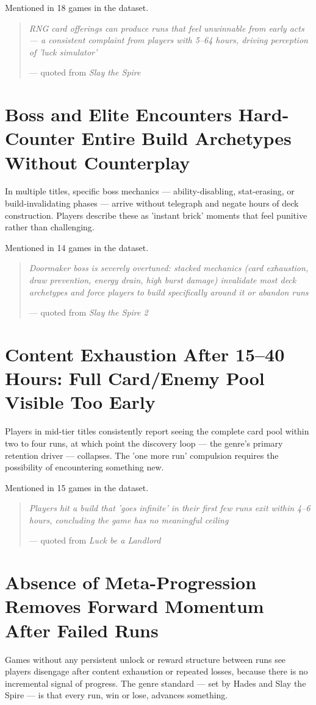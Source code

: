 \documentclass[11pt,letterpaper]{report}
\begin{document}
Mentioned in 18 games in the dataset.

\begin{quote}
\emph{RNG card offerings can produce runs that feel unwinnable from early acts — a consistent complaint from players with 5–64 hours, driving perception of 'luck simulator'}

— quoted from \emph{Slay the Spire}
\end{quote}
\section*{Boss and Elite Encounters Hard-Counter Entire Build Archetypes Without Counterplay}
\label{sec:org82d4431}
In multiple titles, specific boss mechanics — ability-disabling, stat-erasing, or build-invalidating phases — arrive without telegraph and negate hours of deck construction. Players describe these as 'instant brick' moments that feel punitive rather than challenging.

Mentioned in 14 games in the dataset.

\begin{quote}
\emph{Doormaker boss is severely overtuned: stacked mechanics (card exhaustion, draw prevention, energy drain, high burst damage) invalidate most deck archetypes and force players to build specifically around it or abandon runs}

— quoted from \emph{Slay the Spire 2}
\end{quote}
\section*{Content Exhaustion After 15–40 Hours: Full Card/Enemy Pool Visible Too Early}
\label{sec:orgf1c947a}
Players in mid-tier titles consistently report seeing the complete card pool within two to four runs, at which point the discovery loop — the genre's primary retention driver — collapses. The 'one more run' compulsion requires the possibility of encountering something new.

Mentioned in 15 games in the dataset.

\begin{quote}
\emph{Players hit a build that 'goes infinite' in their first few runs exit within 4–6 hours, concluding the game has no meaningful ceiling}

— quoted from \emph{Luck be a Landlord}
\end{quote}
\section*{Absence of Meta-Progression Removes Forward Momentum After Failed Runs}
\label{sec:org39c40d6}
Games without any persistent unlock or reward structure between runs see players disengage after content exhaustion or repeated losses, because there is no incremental signal of progress. The genre standard — set by Hades and Slay the Spire — is that every run, win or lose, advances something.
\end{document}
